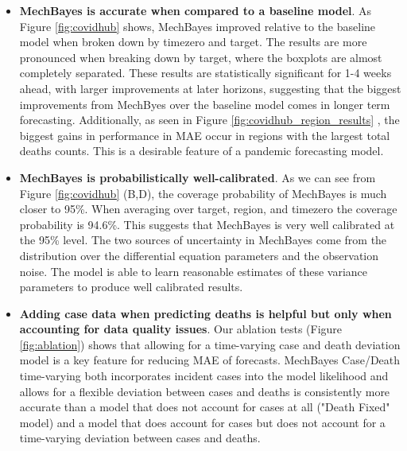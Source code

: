 \documentclass[11pt]{amsart}
\begin{document}
\begin{itemize}

\item \textbf{MechBayes is accurate when compared to a baseline model}. As Figure \ref{fig:covidhub} shows, MechBayes improved relative to the baseline model when broken down by timezero and target. The results are more pronounced when breaking down by target, where the boxplots are almost completely separated. These results are statistically significant for 1-4 weeks ahead, with larger improvements at later horizons, suggesting that the biggest improvements from MechByes over the baseline model comes in longer term forecasting. Additionally, as seen in Figure \ref{fig:covidhub_region_results} , the biggest gains in performance in MAE occur in regions with the largest total deaths counts. This is a desirable feature of a pandemic forecasting model. 

\item \textbf{MechBayes is probabilistically well-calibrated}. As we can see from Figure \ref{fig:covidhub} (B,D), the coverage probability of MechBayes is much closer to 95\%. When averaging over target, region, and timezero the coverage probability is 94.6\%. This suggests that MechBayes is very well calibrated at the 95\% level. The two sources of uncertainty in MechBayes come from the distribution over the differential equation parameters and the observation noise. The model is able to learn reasonable estimates of these variance parameters to produce well calibrated results. 


\item \textbf{Adding case data when predicting deaths is helpful but only when accounting for data quality issues}. Our ablation tests (Figure \ref{fig:ablation}) shows that allowing for a time-varying case and death deviation model is a key feature for reducing MAE of forecasts. MechBayes Case/Death time-varying both incorporates incident cases into the model likelihood and allows for a flexible deviation between cases and deaths is consistently more accurate than a model that does not account for cases at all ("Death Fixed" model) and a model that does account for cases but does not account for a time-varying deviation between cases and deaths.





\end{itemize}
\end{document}
